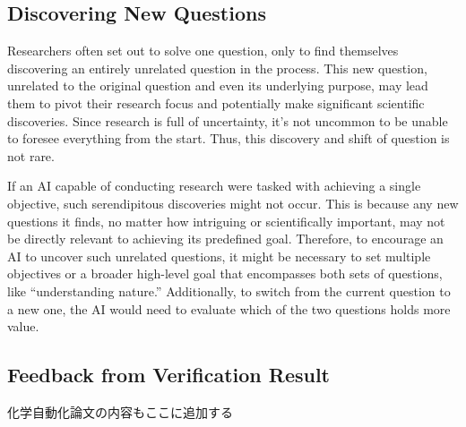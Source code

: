 \subsection{Discovering New Questions}
Researchers often set out to solve one question, only to find themselves discovering an entirely unrelated question in the process. This new question, unrelated to the original question and even its underlying purpose, may lead them to pivot their research focus and potentially make significant scientific discoveries. Since research is full of uncertainty, it's not uncommon to be unable to foresee everything from the start. Thus, this discovery and shift of question is not rare.

If an AI capable of conducting research were tasked with achieving a single objective, such serendipitous discoveries might not occur. This is because any new questions it finds, no matter how intriguing or scientifically important, may not be directly relevant to achieving its predefined goal. Therefore, to encourage an AI to uncover such unrelated questions, it might be necessary to set multiple objectives or a broader high-level goal that encompasses both sets of questions, like ``understanding nature.'' Additionally, to switch from the current question to a new one, the AI would need to evaluate which of the two questions holds more value.



\subsection{Feedback from Verification Result}
化学自動化論文の内容もここに追加する

